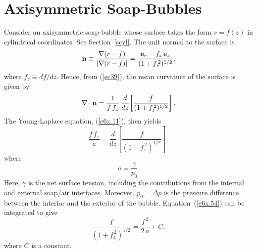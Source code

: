 \section{Axisymmetric Soap-Bubbles}\label{sbubble}
Consider an axisymmetric soap-bubble whose surface takes the form $r=f(z)$ in cylindrical coordinates. See Section~\ref{scyl}. The
unit normal to the surface is
\begin{equation}
{\bf n} \equiv \frac{\nabla(r-f)}{|\nabla(r-f)|} = \frac{{\bf e}_r- f_z\,{\bf e}_z}{(1+f_z^{\,2})^{1/2}},
\end{equation}
where $f_z\equiv df/dz$. Hence, from (\ref{ec39}), the mean curvature of the surface is given by
\begin{equation}
\nabla\cdot {\bf n} = \frac{1}{f\,f_z}\,\frac{d}{dz}\!\left[\frac{f}{(1+f_z^{\,2})^{1/2}}\right].
\end{equation}
The Young-Laplace equation, (\ref{e6x.11}), then yields
\begin{equation}\label{e6x.54}
\frac{f\,f_z}{a} = \frac{d}{dz}\!\left[\frac{f}{(1+f_z^{\,2})^{1/2}}\right],
\end{equation}
where
\begin{equation}
a = \frac{\gamma}{p_0}.
\end{equation}
Here, $\gamma$ is the net surface tension, including the contributions from the internal and external soap/air interfaces. Moreover,
$p_0=\Delta p$ is the pressure difference between the interior and the exterior of the bubble. Equation~(\ref{e6x.54})
can be integrated to give
\begin{equation}\label{e6x.59}
\frac{f}{(1+f_z^{\,2})^{1/2}}  = \frac{f^{\,2}}{2\,a} + C,
\end{equation}
where $C$ is a constant. 

